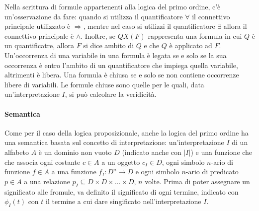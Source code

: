 Nella scrittura di formule appartenenti alla logica del primo ordine, c'è un'osservazione da fare: quando si utilizza il quantificatore \(\forall\) il connettivo principale utilizzato è \(\Rightarrow\), mentre nel caso si utilizzi il quantificatore \(\exists\) allora il connettivo principale è \(\wedge\). Inoltre, se \(QX(F)\) rappresenta una formula in cui \(Q\) è un quantificatre, allora \(F\) si dice ambito di \(Q\) e che \(Q\) è applicato ad \(F\). Un'occorrenza di una variabile in una formula è legata se e solo se la sua occorrenza è entro l'ambito di un quantificatore che impiega quella variabile, altrimenti è libera. Una formula è chiusa se e solo se non contiene occorrenze libere di variabili. Le formule chiuse sono quelle per le quali, data un'interpretazione \(I\), si può calcolare la veridicità.

\paragraph*{Semantica}
Come per il caso della logica proposizionale, anche la logica del primo ordine ha una semantica basata sul concetto di interpretazione: un'interpretazione \(I\) di un alfabeto \(A\) è un dominio non vuoto \(D\) (indicato anche con \(|I|\)) e una funzione che che associa ogni costante \(c\in A\) a un oggetto \(c_I \in D\), ogni simbolo \(n\)-ario di funzione \(f\in A\) a una funzione \(f_I:D^n\to D\) e ogni simbolo \(n\)-ario di predicato \(p\in A\) a una relazione \(p_I\subseteq D\times D\times ... \times D\), \(n\) volte. Prima di poter assegnare un significato alle fromule, va definito il significato di ogni termine, indicato con \(\phi_I(t)\) con \(t\) il termine a cui dare singificato nell'interpretazione \(I\). 

\break

